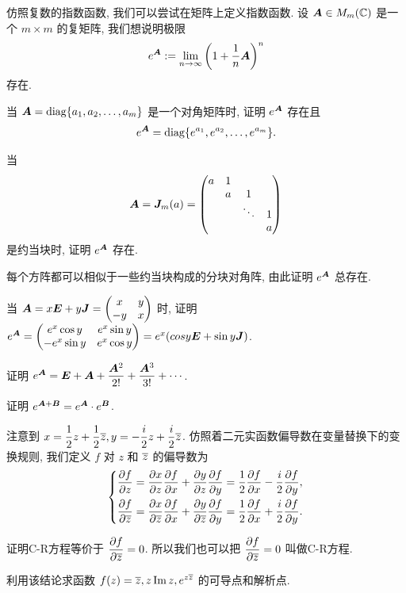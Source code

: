 \sectionExtraReading
\begin{homework}
  \item 仿照复数的指数函数, 我们可以尝试在矩阵上定义指数函数. 设 ${\boldsymbol{A}}\in M_m({\mathbb{C}})$ 是一个 $m\times m$ 的复矩阵, 我们想说明极限
  \[e^{\boldsymbol{A}}:=\lim_{n\to \infty}\left(1+\frac1n {\boldsymbol{A}}\right)^n\]
  存在.
  \begin{exlist}
    \item 当 ${\boldsymbol{A}}={\mathrm{diag}}{\left\{a_1,a_2,\dots,a_m\right\}}$ 是一个对角矩阵时, 证明 $e^{\boldsymbol{A}}$ 存在且
    \[e^{\boldsymbol{A}}={\mathrm{diag}}{\left\{e^{a_1},e^{a_2},\dots,e^{a_m}\right\}}.\]
    \item 当
    \[{\boldsymbol{A}}={\boldsymbol{J}}_m(a)=\begin{pmatrix}
      a&1&   &\\
      &a& 1 &\\
      & &\ddots&1\\
      & &      &a
    \end{pmatrix}\]
    是约当块时, 证明 $e^{\boldsymbol{A}}$ 存在.
    \item 每个方阵都可以相似于一些约当块构成的分块对角阵, 由此证明 $e^{\boldsymbol{A}}$ 总存在.
    \item 当 ${\boldsymbol{A}}=x{\boldsymbol{E}}+y{\boldsymbol{J}}=\begin{pmatrix}
      x&y\\-y&x
    \end{pmatrix}$ 时, 证明 $e^{\boldsymbol{A}}=\begin{pmatrix}
      e^x\cos y&e^x\sin y\\-e^x\sin y&e^x\cos y
    \end{pmatrix}=e^x(cos y{\boldsymbol{E}}+\sin y {\boldsymbol{J}})$.
    \item 证明 $e^{\boldsymbol{A}}={\boldsymbol{E}}+{\boldsymbol{A}}+\dfrac{{\boldsymbol{A}}^2}{2!}+\dfrac{{\boldsymbol{A}}^3}{3!}+\cdots$.
    \item 证明 $e^{{\boldsymbol{A}}+{\boldsymbol{B}}}=e^{\boldsymbol{A}}\cdot e^{\boldsymbol{B}}$.
  \end{exlist}
  
  \item 注意到 $x=\dfrac12z+\dfrac12\overline z,y=-\dfrac i2z+\dfrac i2\overline z$.
  仿照着二元实函数偏导数在变量替换下的变换规则, 我们定义 $f$ 对 $z$ 和 $\overline z$ 的偏导数为
  \[\left\{
  \begin{aligned}
    \frac{\partial f}{\partial z}&
  =\frac{\partial x}{\partial z}\frac{\partial f}{\partial x}
    +\frac{\partial y}{\partial z}\frac{\partial f}{\partial y}
  =\frac12\frac{\partial f}{\partial x}-\frac i2\frac{\partial f}{\partial y},\\
    \frac{\partial f}{\partial \overline z}&
  =\frac{\partial x}{\partial \overline z}\frac{\partial f}{\partial x}
    +\frac{\partial y}{\partial \overline z}\frac{\partial f}{\partial y}
  =\frac12\frac{\partial f}{\partial x}+\frac i2\frac{\partial f}{\partial y}.
  \end{aligned}\right.\]
  \begin{exlist}
  \item 证明C-R方程等价于 $\dfrac{\partial f}{\partial \overline z}
  =0$.
  所以我们也可以把 \emph{$\dfrac{\partial f}{\partial \overline z}=0$} 叫做C-R方程.

  \item 利用该结论求函数 $f(z)=\overline z, z\operatorname{Im} z, e^{z\overline z}$ 的可导点和解析点.
  \end{exlist}
\end{homework}


